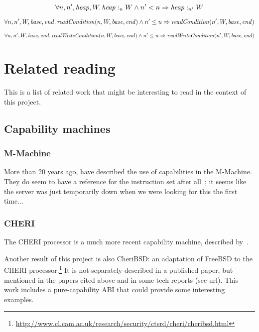 \documentclass{article}
\newcommand{\var}[1]{\mathit{#1}}
\newcommand{\start}{\var{base}}
\newcommand{\addrend}{\var{end}}
\newcommand{\heap}{\var{heap}}
\newcommand{\plainfun}[1]{\mathit{#1}}
\newcommand{\readCond}[1]{\plainfun{readCondition}(#1)}
\newcommand{\writeCond}[1]{\plainfun{readWriteCondition}(#1)}
\newcommand{\heapSat}[3][\heap]{#1 :_{#2} #3}
\begin{document}
\begin{lemma}
\[
  \forall n,n',\heap, W \ldotp \heapSat{n}{W} \land n' < n \Rightarrow \heapSat{n'}{W}
\]
\end{lemma}

\begin{lemma}
\[
\forall n,n',W,\start, \addrend \ldotp \readCond{n,W,\start,\addrend} \land n' \leq n \Rightarrow \readCond{n',W,\start,\addrend}
\]
\end{lemma}
\begin{lemma}
\[
\forall n,n',W,\start, \addrend \ldotp \writeCond{n,W,\start,\addrend} \land n' \leq n \Rightarrow \writeCond{n',W,\start,\addrend}
\]
\end{lemma}


\section{Related reading}
\label{sec:related-reading}

This is a list of related work that might be interesting to read in the context
of this project.

\subsection{Capability machines}
\label{sec:rw-cap-machines}

\subsubsection{M-Machine}
More than 20 years ago, \cite{Carter:1994:HSF:195473.195579} have described the
use of capabilities in the M-Machine. They do seem to have a reference for the
instruction set after all~\citep{Dally1997Memo59}; it seems like the server was
just temporarily down when we were looking for this the first time...

\subsubsection{CHERI}

The CHERI processor is a much more recent capability machine, described
by~\cite{Woodruff:2014:CCM:2665671.2665740,Watson2015Cheri}.

Another result of this project is also CheriBSD: an adaptation of FreeBSD to the
CHERI
processor.\footnote{\url{http://www.cl.cam.ac.uk/research/security/ctsrd/cheri/cheribsd.html}}
It is not separately described in a published paper, but mentioned in the papers
cited above and in some tech reports (see url). This work includes a
pure-capability ABI that could provide some interesting examples.
\end{document}
